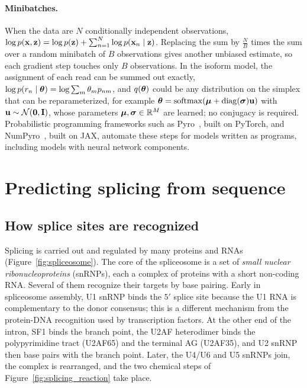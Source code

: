 \paragraph{Minibatches.} When the data are $N$ conditionally independent observations, $\log p(\mathbf{x},\mathbf{z})=\log p(\mathbf{z})+\sum_{n=1}^N\log p(\mathbf{x}_n\mid\mathbf{z})$. Replacing the sum by $\frac{N}{B}$ times the sum over a random minibatch of $B$ observations gives another unbiased estimate, so each gradient step touches only $B$ observations. In the isoform model, the assignment of each read can be summed out exactly, $\log p(r_n\mid\boldsymbol{\theta})=\log\sum_m\theta_m p_{nm}$, and $q(\boldsymbol{\theta})$ could be any distribution on the simplex that can be reparameterized, for example $\boldsymbol{\theta}=\operatorname{softmax}(\boldsymbol{\mu}+\operatorname{diag}(\boldsymbol{\sigma})\mathbf{u})$ with $\mathbf{u}\sim\mathcal{N}(\mathbf{0},\mathbf{I})$, whose parameters $\boldsymbol{\mu},\boldsymbol{\sigma}\in\mathbb{R}^M$ are learned; no conjugacy is required. Probabilistic programming frameworks such as Pyro~\citep{bingham2019}, built on PyTorch, and NumPyro~\citep{phan2019}, built on JAX, automate these steps for models written as programs, including models with neural network components.

\section{Predicting splicing from sequence}
\label{sec:seq_models}

\subsection{How splice sites are recognized}

Splicing is carried out and regulated by many proteins and RNAs (Figure~\ref{fig:spliceosome}). The core of the spliceosome is a set of \emph{small nuclear ribonucleoproteins} (snRNPs), each a complex of proteins with a short non-coding RNA. Several of them recognize their targets by base pairing. Early in spliceosome assembly, U1 snRNP binds the $5'$ splice site because the U1 RNA is complementary to the donor consensus; this is a different mechanism from the protein-DNA recognition used by transcription factors. At the other end of the intron, SF1 binds the branch point, the U2AF heterodimer binds the polypyrimidine tract (U2AF65) and the terminal AG (U2AF35), and U2 snRNP then base pairs with the branch point. Later, the U4/U6 and U5 snRNPs join, the complex is rearranged, and the two chemical steps of Figure~\ref{fig:splicing_reaction} take place.

